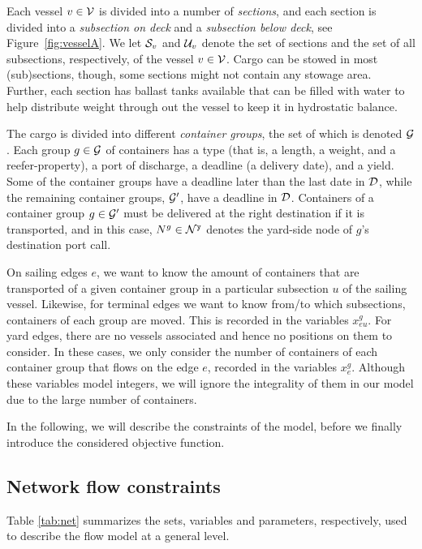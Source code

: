 Each vessel $v\in\mathcal{V}$ is divided into a number of \emph{sections}, and each section is divided into a \emph{subsection on deck} and a \emph{subsection below deck}, see Figure~\ref{fig:vesselA}. We let $\mathcal{S}_v$ and $\mathcal{U}_v$ denote the set of sections and the set of all subsections, respectively, of the vessel $v\in \mathcal{V}$.
Cargo can be stowed in most (sub)sections, though, some sections might not contain any stowage area. Further, each section has ballast tanks available that can be filled with water to help distribute weight through out the vessel to keep it in hydrostatic balance.


The cargo is divided into different \emph{container groups}, the set of which is denoted $\mathcal{G}$. Each group $g\in \mathcal{G}$ of containers has a type (that is, a length, a weight, and a reefer-property), a port of discharge, a deadline (a delivery date), and a yield. Some of the container groups have a deadline later than the last date in $\mathcal{D}$, while the remaining container groups, $\mathcal{G}'$, have a deadline in $\mathcal{D}$. Containers of a container group $g\in\mathcal{G}'$ must be delivered at the right destination if it is transported, and in this case, $N^g \in \mathcal{N}^\texttt{y}$ denotes the yard-side node of $g$'s destination port call.  

On sailing edges $e$, we want to know the amount of containers that are transported of a given container group in a particular subsection $u$ of the sailing vessel. Likewise, for terminal edges we want to know from/to which subsections, containers of each group are moved. This is recorded in the variables $x^g_{eu}$. For yard edges, there are no vessels associated and hence no positions on them to consider. In these cases, we only consider the number of containers of each container group that flows on the edge $e$, recorded in the variables $x^g_e$. Although these variables model integers,  we will ignore the integrality of them in our model due to the large number of containers.

In the following, we will describe the constraints of the model, before we finally introduce the considered objective function.
\subsection{Network flow constraints}\label{sec:flow}
 Table \ref{tab:net} summarizes the sets, variables and parameters, respectively, used to describe the flow model at a general level.

